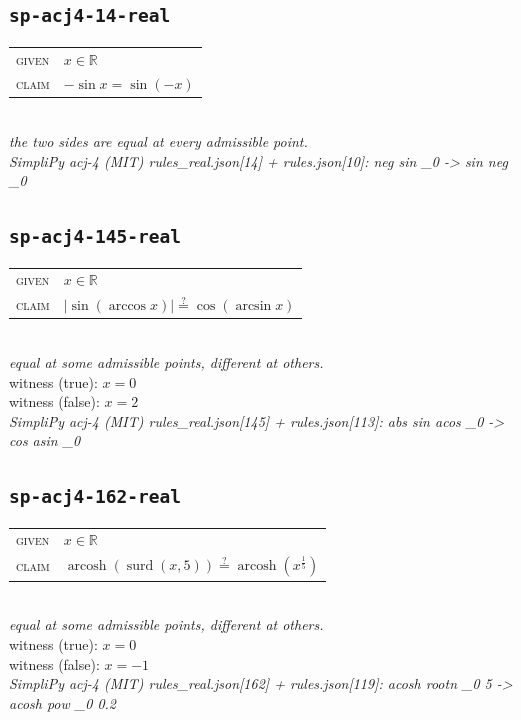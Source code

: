 \documentclass[11pt]{article}
\begin{document}
\subsection*{\texttt{sp-acj4-14-real}}
\begin{tabular}{@{}l@{\quad}l@{}}
\textsc{given} & $x \in \mathbb{R}$ \\[4pt]
\textsc{claim} & $\displaystyle -\sin x = \sin\left(-x\right)$ \\
\end{tabular}\\[2pt]
{\small\emph{the two sides are equal at every admissible point.}}\\
\emph{SimpliPy acj-4 (MIT) rules\_real.json[14] + rules.json[10]: neg sin \_0  ->  sin neg \_0}\\

\subsection*{\texttt{sp-acj4-145-real}}
\begin{tabular}{@{}l@{\quad}l@{}}
\textsc{given} & $x \in \mathbb{R}$ \\[4pt]
\textsc{claim} & $\displaystyle \left|\sin\left(\arccos x\right)\right| \overset{?}{=} \cos\left(\arcsin x\right)$ \\
\end{tabular}\\[2pt]
{\small\emph{equal at some admissible points, different at others.}}\\
{\footnotesize\color{gray}witness (true): $x = 0$}\\
{\footnotesize\color{gray}witness (false): $x = 2$}\\
\emph{SimpliPy acj-4 (MIT) rules\_real.json[145] + rules.json[113]: abs sin acos \_0  ->  cos asin \_0}\\

\subsection*{\texttt{sp-acj4-162-real}}
\begin{tabular}{@{}l@{\quad}l@{}}
\textsc{given} & $x \in \mathbb{R}$ \\[4pt]
\textsc{claim} & $\displaystyle \operatorname{arcosh}\left(\operatorname{surd}\left(x, 5\right)\right) \overset{?}{=} \operatorname{arcosh}\left(x^{\frac{1}{5}}\right)$ \\
\end{tabular}\\[2pt]
{\small\emph{equal at some admissible points, different at others.}}\\
{\footnotesize\color{gray}witness (true): $x = 0$}\\
{\footnotesize\color{gray}witness (false): $x = -1$}\\
\emph{SimpliPy acj-4 (MIT) rules\_real.json[162] + rules.json[119]: acosh rootn \_0 5  ->  acosh pow \_0 0.2}\\
\end{document}
